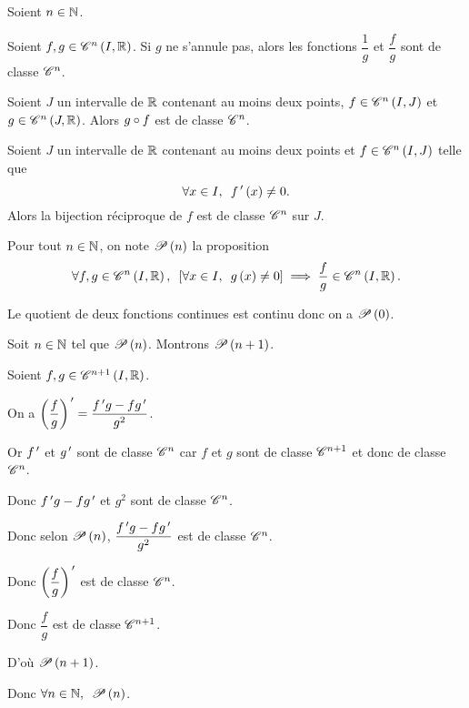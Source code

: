 \begin{dem}
\end{dem}

\begin{prop}
Soient \(n\in\N\).

Soient \(f,g\in\ensclasse{n}{I}{\R}\). Si \(g\) ne s'annule pas, alors les fonctions \(\dfrac{1}{g}\) et \(\dfrac{f}{g}\) sont de classe \(\classe{n}\).

Soient \(J\) un intervalle de \(\R\) contenant au moins deux points, \(f\in\ensclasse{n}{I}{J}\) et \(g\in\ensclasse{n}{J}{\R}\). Alors \(g\rond f\) est de classe \(\classe{n}\).

Soient \(J\) un intervalle de \(\R\) contenant au moins deux points et \(f\in\ensclasse{n}{I}{J}\) telle que \[\quantifs{\forall x\in I}f\prim\paren{x}\not=0.\] Alors la bijection réciproque de \(f\) est de classe \(\classe{n}\) sur \(J\).
\end{prop}

\begin{dem}
\end{dem}

\begin{dem}
Pour tout \(n\in\N\), on note \(\P{n}\) la proposition \[\quantifs{\forall f,g\in\ensclasse{n}{I}{\R}}\croch{\quantifs{\forall x\in I}g\paren{x}\not=0}\imp\dfrac{f}{g}\in\ensclasse{n}{I}{\R}.\]

Le quotient de deux fonctions continues est continu donc on a \(\P{0}\).

Soit \(n\in\N\) tel que \(\P{n}\). Montrons \(\P{n+1}\).

Soient \(f,g\in\ensclasse{n+1}{I}{\R}\).

On a \(\paren{\dfrac{f}{g}}\prim=\dfrac{f\prim g-fg\prim}{g^2}\).

Or \(f\prim\) et \(g\prim\) sont de classe \(\classe{n}\) car \(f\) et \(g\) sont de classe \(\classe{n+1}\) et donc de classe \(\classe{n}\).

Donc \(f\prim g-fg\prim\) et \(g^2\) sont de classe \(\classe{n}\).

Donc selon \(\P{n}\), \(\dfrac{f\prim g-fg\prim}{g^2}\) est de classe \(\classe{n}\).

Donc \(\paren{\dfrac{f}{g}}\prim\) est de classe \(\classe{n}\).

Donc \(\dfrac{f}{g}\) est de classe \(\classe{n+1}\).

D'où \(\P{n+1}\).

Donc \(\quantifs{\forall n\in\N}\P{n}\).
\end{dem}


